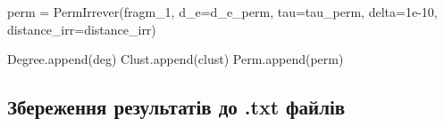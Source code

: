 \documentclass[
  letterpaper,
]{report}
\newenvironment{Shaded}{\begin{snugshade}}{\end{snugshade}}
\newcommand{\FloatTok}[1]{\textcolor[rgb]{0.68,0.00,0.00}{#1}}
\newcommand{\NormalTok}[1]{\textcolor[rgb]{0.00,0.23,0.31}{#1}}
\newcommand{\OperatorTok}[1]{\textcolor[rgb]{0.37,0.37,0.37}{#1}}
\begin{document}
\begin{Shaded}
\begin{Highlighting}[]
\NormalTok{    perm }\OperatorTok{=}\NormalTok{ PermIrrever(fragm\_1, }
\NormalTok{                          d\_e}\OperatorTok{=}\NormalTok{d\_e\_perm, }
\NormalTok{                          tau}\OperatorTok{=}\NormalTok{tau\_perm, }
\NormalTok{                          delta}\OperatorTok{=}\FloatTok{1e{-}10}\NormalTok{, }
\NormalTok{                          distance\_irr}\OperatorTok{=}\NormalTok{distance\_irr)}
      
\NormalTok{    Degree.append(deg)}
\NormalTok{    Clust.append(clust)}
\NormalTok{    Perm.append(perm)}
\end{Highlighting}
\end{Shaded}

\hypertarget{ux437ux431ux435ux440ux435ux436ux435ux43dux43dux44f-ux440ux435ux437ux443ux43bux44cux442ux430ux442ux456ux432-ux434ux43e-.txt-ux444ux430ux439ux43bux456ux432}{%
\subsection{Збереження результатів до .txt
файлів}\label{ux437ux431ux435ux440ux435ux436ux435ux43dux43dux44f-ux440ux435ux437ux443ux43bux44cux442ux430ux442ux456ux432-ux434ux43e-.txt-ux444ux430ux439ux43bux456ux432}}
\end{document}
